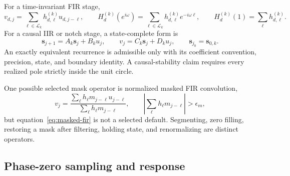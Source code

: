 For a time-invariant FIR stage,
\begin{equation}
 v_{d,j}=\sum_{\ell\in\mathcal L_k}h^{(k)}_{d,\ell}u_{d,j-\ell},
 \qquad
 H^{(k)}_d(e^{i\omega})=
 \sum_{\ell\in\mathcal L_k}h^{(k)}_{d,\ell}e^{-i\omega\ell},
 \qquad H^{(k)}_d(1)=\sum_\ell h^{(k)}_{d,\ell}.
 \tag{SCI-RTC-EQ-008}\label{eq:fir}
\end{equation}
For a causal IIR or notch stage, a state-complete form is
\begin{equation}
 \mathbf s_{j+1}=A_k\mathbf s_j+B_ku_j,
 \qquad v_j=C_k\mathbf s_j+D_ku_j,
 \qquad \mathbf s_{j_0}=\mathbf s_{0,k}.
 \tag{SCI-RTC-EQ-009}\label{eq:iir}
\end{equation}
An exactly equivalent recurrence is admissible only with its coefficient
convention, precision, state, and boundary identity.  A causal-stability claim
requires every realized pole strictly inside the unit circle.

One possible selected mask operator is normalized masked FIR convolution,
\begin{equation}
 v_j=
 \frac{\sum_\ell h_\ell m_{j-\ell}u_{j-\ell}}
      {\sum_\ell h_\ell m_{j-\ell}},
 \qquad
 \left|\sum_\ell h_\ell m_{j-\ell}\right|>\epsilon_m ,
 \tag{SCI-RTC-EQ-010}\label{eq:masked-fir}
\end{equation}
but equation~\eqref{eq:masked-fir} is not a selected default.  Segmenting,
zero filling, restoring a mask after filtering, holding state, and
renormalizing are distinct operators.

\subsection{Phase-zero sampling and response}

